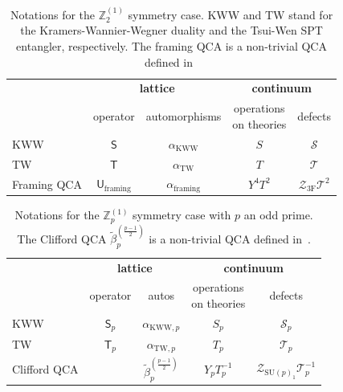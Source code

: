 \documentclass[aps,twocolumn,prx,floatfix,preprintnumbers, nofootinbib,10pt]{revtex4-2}
\numberwithin{equation}{section}
\theoremstyle{definition}
\theoremstyle{remark}
\theoremstyle{claim}
\newcommand{\KWW}{\text{KWW}}
\newcommand{\TW}{\text{TW}}
\newcommand{\Z}{{\mathbb Z}}
\newcommand{\cT}{\mathcal{T}}
\newcommand{\mc}[1]{\mathcal{#1}}
\renewcommand{\sf}[1]{\mathsf{#1}}
\begin{document}
\begin{table}[ht]
\centering
\renewcommand{\arraystretch}{1.4}
\begin{tabular}{l cc cc}
\toprule
 & \multicolumn{2}{c}{\textbf{lattice}} & \multicolumn{2}{c}{\textbf{continuum}} \\
\cmidrule(lr){2-3}\cmidrule(lr){4-5}
 & operator & automorphisms & \makecell{operations\\on theories} & defects \\
\midrule
KWW          & $\sf{S}$ & $\alpha_\KWW$      & $ S $   & $\mathcal{S}$          \\
TW           & $\mathsf{T} $                         & $\alpha_{\TW}$      & $ T $   & $\mathcal{T}$          \\
Framing QCA  & $\mathsf{U}_{\text{framing}}$       & $\alpha_{\text{framing}}$  & $ Y^4T^2 $ & $\mc{Z}_\text{3F} \cT^2$ 
\\
\bottomrule
\end{tabular}
\caption{Notations for the $\Z_2^{(1)}$ symmetry case. KWW and TW stand for the Kramers-Wannier-Wegner duality and the Tsui-Wen SPT entangler, respectively. The framing QCA is a non-trivial QCA defined in~\cite{Fidkowski:2023dpe} \label{tab:Z2Not}}
\end{table}

\begin{table}[ht]
\centering
\renewcommand{\arraystretch}{1.6}
\begin{tabular}{l cc cc}
\toprule
 & \multicolumn{2}{c}{\textbf{lattice}} & \multicolumn{2}{c}{\textbf{continuum}} \\
\cmidrule(lr){2-3}\cmidrule(lr){4-5}
 & operator & autos & \makecell{operations\\on theories} & defects \\
\midrule
KWW
  & $\mathsf{S}_{p}$
  & $\alpha_{\KWW,p}$
  & ${S}_{p}$
  & $\mathcal{S}_{p}$ \\
TW
  & $\mathsf{T}_{p}$
  & $\alpha_{\TW,p}$
  & ${T}_{p}$
  & $\mathcal{T}_{p}$ \\
Clifford QCA
  & \makecell{}
  & {$\tilde{\beta}_{p}^{(\frac{p-1}{2})}$}
  & ${Y}_{p} T_p^{-1}$
  & $\mc{Z}_{\mathrm{SU}(p)_1}\mathcal{T}_p^{-1}$ \\
\bottomrule
\end{tabular}
\caption{Notations for the $\mathbb{Z}_p^{(1)}$ symmetry case with $p$ an odd prime. The Clifford QCA $\tilde{\beta}_p^{(\frac{p-1}{2})}$ is a non-trivial QCA defined in~\cite{MengSun2026}. \label{tab:ZpNot}}
\end{table}
\end{document}
